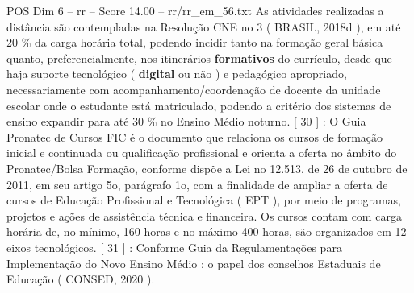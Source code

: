 \begin{textsample}{POS Dim 6 – rr – Score 14.00 – rr/rr\_em\_56.txt}
As atividades realizadas a distância são contempladas na Resolução CNE no 3 ( BRASIL, 2018d ), em até 20 \% da carga horária total, podendo incidir tanto na formação geral básica quanto, preferencialmente, nos itinerários \textbf{formativos} do currículo, desde que haja suporte tecnológico ( \textbf{digital} ou não ) e pedagógico apropriado, necessariamente com acompanhamento/coordenação de docente da unidade escolar onde o estudante está matriculado, podendo a critério dos sistemas de ensino expandir para até 30 \% no Ensino Médio noturno. [ 30 ] : O Guia Pronatec de Cursos FIC é o documento que relaciona os cursos de formação inicial e continuada ou qualificação profissional e orienta a oferta no âmbito do Pronatec/Bolsa Formação, conforme dispõe a Lei no 12.513, de 26 de outubro de 2011, em seu artigo 5o, parágrafo 1o, com a finalidade de ampliar a oferta de cursos de Educação Profissional e Tecnológica ( EPT ), por meio de programas, projetos e ações de assistência técnica e financeira.
Os cursos contam com carga horária de, no mínimo, 160 horas e no máximo 400 horas, são organizados em 12 eixos tecnológicos. [ 31 ] : Conforme Guia da Regulamentações para Implementação do Novo Ensino Médio : o papel dos conselhos Estaduais de Educação ( CONSED, 2020 ).

\end{textsample}
